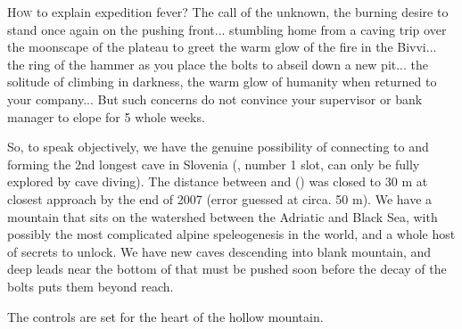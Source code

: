 \thispagestyle{endchapter}

\begin{tcolorbox}

\vspace{80pt}
	\lettrine{H}{ow} to explain expedition fever? The call of the unknown, the burning desire to stand once again on the pushing front... stumbling home from a caving trip over the moonscape of the plateau to greet the warm glow of the fire in the Bivvi... the ring of the hammer as you place the bolts to abseil down a new pit... the solitude of climbing in darkness, the warm glow of humanity when returned to your company... But such concerns do not convince your supervisor or bank manager to elope for 5 whole weeks.

    So, to speak objectively, we have the genuine possibility of connecting  to  and forming the 2nd longest cave in Slovenia (, number 1 slot, can only be fully explored by cave diving). The distance between  and  () was closed to 30 m at closest approach by the end of 2007 (error guessed at circa. 50 m). We have a mountain that sits on the watershed between the Adriatic and Black Sea, with possibly the most complicated alpine speleogenesis in the world, and a whole host of secrets to unlock. We have new caves descending into blank mountain, and deep leads near the bottom of  that must be pushed soon before the decay of the bolts puts them beyond reach.

    The controls are set for the heart of the hollow mountain.



\end{tcolorbox} 
